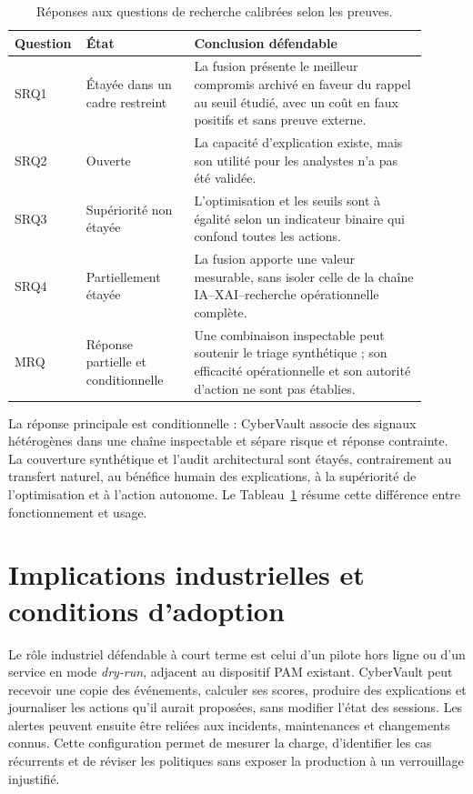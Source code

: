 \documentclass[11pt,a4paper,oneside]{report}
\theoremstyle{definition}
\theoremstyle{plain}
\begin{document}
\begin{table}[tb]
  \centering
  \caption{Réponses aux questions de recherche calibrées selon les preuves.}
  \label{tab:disc-rq-summary}
  \small
  \begin{tabular}{@{}p{0.11\linewidth}p{0.25\linewidth}p{0.54\linewidth}@{}}
    \toprule
    Question & État & Conclusion défendable \\
    \midrule
    SRQ1 & Étayée dans un cadre restreint &
      La fusion présente le meilleur compromis archivé en faveur du rappel au
      seuil étudié, avec un coût en faux positifs et sans preuve externe. \\
    SRQ2 & Ouverte &
      La capacité d'explication existe, mais son utilité pour les analystes
      n'a pas été validée. \\
    SRQ3 & Supériorité non étayée &
      L'optimisation et les seuils sont à égalité selon un indicateur binaire
      qui confond toutes les actions. \\
    SRQ4 & Partiellement étayée &
      La fusion apporte une valeur mesurable, sans isoler celle de la chaîne
      IA--XAI--recherche opérationnelle complète. \\
    MRQ & Réponse partielle et conditionnelle &
      Une combinaison inspectable peut soutenir le triage synthétique ; son
      efficacité opérationnelle et son autorité d'action ne sont pas établies. \\
    \bottomrule
  \end{tabular}
\end{table}

La réponse principale est conditionnelle : CyberVault associe des signaux
hétérogènes dans une chaîne inspectable et sépare risque et réponse contrainte.
La couverture synthétique et l'audit architectural sont étayés, contrairement
au transfert naturel, au bénéfice humain des explications, à la supériorité de
l'optimisation et à l'action autonome. Le
Tableau~\ref{tab:disc-rq-summary} résume cette différence entre fonctionnement
et usage.

\section{Implications industrielles et conditions d'adoption}
\label{sec:validation-industry}

Le rôle industriel défendable à court terme est celui d'un pilote hors ligne
ou d'un service en mode \emph{dry-run}, adjacent au dispositif PAM existant.
CyberVault peut recevoir une copie des événements, calculer ses scores,
produire des explications et journaliser les actions qu'il aurait proposées,
sans modifier l'état des sessions. Les alertes peuvent ensuite être reliées aux
incidents, maintenances et changements connus. Cette configuration permet de
mesurer la charge, d'identifier les cas récurrents et de réviser les politiques
sans exposer la production à un verrouillage injustifié.
\end{document}
